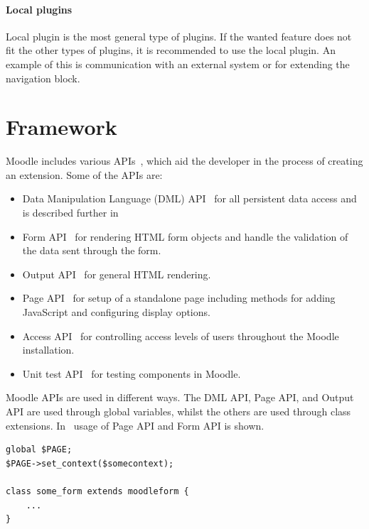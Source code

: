 \paragraph{Local plugins}
\label{par:localplugin}
Local plugin is the most general type of plugins. 
If the wanted feature does not fit the other types of plugins, it is recommended to use the local plugin. 
An example of this is communication with an external system or for extending the navigation block. 



\section{Framework}
Moodle includes various APIs~\cite{moodlecoreapis}, which aid the developer in the process of creating an extension. Some of the APIs are:

\begin{itemize}
	\item Data Manipulation Language (DML) API~\cite{moodledml} for all persistent data access and is described further in 
	\item Form API~\cite{moodleformapi} for rendering HTML form objects and handle the validation of the data sent through the form. 
	\item Output API~\cite{moodleoutputapi} for general HTML rendering.
	\item Page API~\cite{moodlepageapi} for setup of a standalone page including methods for adding JavaScript and configuring display options. 
	\item Access API~\cite{moodleaccessapi} for controlling access levels of users throughout the Moodle installation. 
	\item Unit test API~\cite{moodleunittestapi} for testing components in Moodle.
\end{itemize}
Moodle APIs are used in different ways. 
The DML API, Page API, and Output API are used through global variables, whilst the others are used through class extensions. 
In~ usage of Page API and Form API is shown.
\begin{lstlisting}[style=phpCode, caption=\myCaption{Example of the Page API and Form API in Moodle}, label=moodleapiusage]
global $PAGE;
$PAGE->set_context($somecontext);

class some_form extends moodleform {
	...
}
\end{lstlisting}

